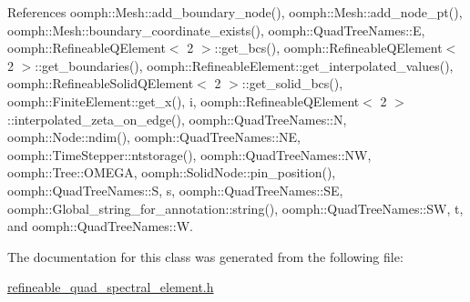 References oomph\+::\+Mesh\+::add\+\_\+boundary\+\_\+node(), oomph\+::\+Mesh\+::add\+\_\+node\+\_\+pt(), oomph\+::\+Mesh\+::boundary\+\_\+coordinate\+\_\+exists(), oomph\+::\+Quad\+Tree\+Names\+::E, oomph\+::\+Refineable\+Q\+Element$<$ 2 $>$\+::get\+\_\+bcs(), oomph\+::\+Refineable\+Q\+Element$<$ 2 $>$\+::get\+\_\+boundaries(), oomph\+::\+Refineable\+Element\+::get\+\_\+interpolated\+\_\+values(), oomph\+::\+Refineable\+Solid\+Q\+Element$<$ 2 $>$\+::get\+\_\+solid\+\_\+bcs(), oomph\+::\+Finite\+Element\+::get\+\_\+x(), i, oomph\+::\+Refineable\+Q\+Element$<$ 2 $>$\+::interpolated\+\_\+zeta\+\_\+on\+\_\+edge(), oomph\+::\+Quad\+Tree\+Names\+::N, oomph\+::\+Node\+::ndim(), oomph\+::\+Quad\+Tree\+Names\+::\+NE, oomph\+::\+Time\+Stepper\+::ntstorage(), oomph\+::\+Quad\+Tree\+Names\+::\+NW, oomph\+::\+Tree\+::\+O\+M\+E\+GA, oomph\+::\+Solid\+Node\+::pin\+\_\+position(), oomph\+::\+Quad\+Tree\+Names\+::S, s, oomph\+::\+Quad\+Tree\+Names\+::\+SE, oomph\+::\+Global\+\_\+string\+\_\+for\+\_\+annotation\+::string(), oomph\+::\+Quad\+Tree\+Names\+::\+SW, t, and oomph\+::\+Quad\+Tree\+Names\+::W.



The documentation for this class was generated from the following file\+:\begin{DoxyCompactItemize}
\item 
\hyperlink{refineable__quad__spectral__element_8h}{refineable\+\_\+quad\+\_\+spectral\+\_\+element.\+h}\end{DoxyCompactItemize}

